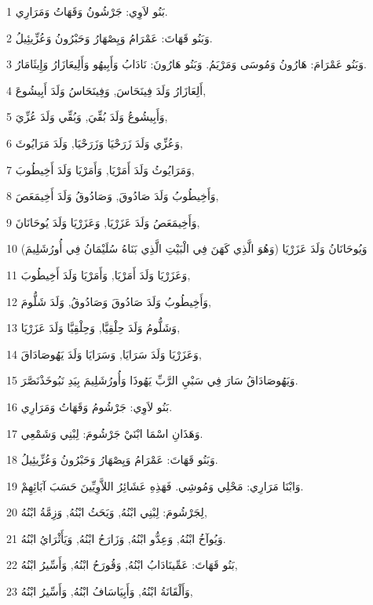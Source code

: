 \par 1 بَنُو لاَوِي: جَرْشُونُ وَقَهَاتُ وَمَرَارِي.
\par 2 وَبَنُو قَهَاتَ: عَمْرَامُ وَيِصْهَارُ وَحَبْرُونُ وَعُزِّيئِيلُ.
\par 3 وَبَنُو عَمْرَامَ: هَارُونُ وَمُوسَى وَمَرْيَمُ. وَبَنُو هَارُونَ: نَادَابُ وَأَبِيهُو وَأَلِيعَازَارُ وَإِيثَامَارُ.
\par 4 أَلِعَازَارُ وَلَدَ فِينَحَاسَ, وَفِينَحَاسُ وَلَدَ أَبِيشُوعَ,
\par 5 وَأَبِيشُوعُ وَلَدَ بُقِّيَ, وَبُقِّي وَلَدَ عُزِّيَ,
\par 6 وَعُزِّي وَلَدَ زَرَحْيَا وَزَرَحْيَا, وَلَدَ مَرَايُوثَ,
\par 7 وَمَرَايُوثُ وَلَدَ أَمَرْيَا, وَأَمَرْيَا وَلَدَ أَخِيطُوبَ,
\par 8 وَأَخِيطُوبُ وَلَدَ صَادُوقَ, وَصَادُوقُ وَلَدَ أَخِيمَعَصَ,
\par 9 وَأَخِيمَعَصُ وَلَدَ عَزَرْيَا, وَعَزَرْيَا وَلَدَ يُوحَانَانَ,
\par 10 وَيُوحَانَانُ وَلَدَ عَزَرْيَا (وَهُوَ الَّذِي كَهَنَ فِي الْبَيْتِ الَّذِي بَنَاهُ سُلَيْمَانُ فِي أُورُشَلِيمَ)
\par 11 وَعَزَرْيَا وَلَدَ أَمَرْيَا, وَأَمَرْيَا وَلَدَ أَخِيطُوبَ,
\par 12 وَأَخِيطُوبُ وَلَدَ صَادُوقَ وَصَادُوقُ, وَلَدَ شَلُّومَ,
\par 13 وَشَلُّومُ وَلَدَ حِلْقِيَّا, وَحِلْقِيَّا وَلَدَ عَزَرْيَا,
\par 14 وَعَزَرْيَا وَلَدَ سَرَايَا, وَسَرَايَا وَلَدَ يَهُوصَادَاقَ,
\par 15 وَيَهُوصَادَاقُ سَارَ فِي سَبْيِ الرَّبِّ يَهُوذَا وَأُورُشَلِيمَ بِيَدِ نَبُوخَذْنَصَّرَ.
\par 16 بَنُو لاَوِي: جَرْشُومُ وَقَهَاتُ وَمَرَارِي.
\par 17 وَهَذَانِ اسْمَا ابْنَيْ جَرْشُومَ: لِبْنِي وَشَمْعِي.
\par 18 وَبَنُو قَهَاتَ: عَمْرَامُ وَيِصْهَارُ وَحَبْرُونُ وَعُزِّيئِيلُ.
\par 19 وَابْنَا مَرَارِي: مَحْلِي وَمُوشِي. فَهَذِهِ عَشَائِرُ اللاَّوِيِّينَ حَسَبَ آبَائِهِمْ.
\par 20 لِجَرْشُومَ: لِبْنِي ابْنُهُ, وَيَحَثُ ابْنُهُ, وَزِمَّةُ ابْنُهُ,
\par 21 وَيُوآخُ ابْنُهُ, وَعِدُّو ابْنُهُ, وَزَارَحُ ابْنُهُ, وَيَأَثْرَايُ ابْنُهُ.
\par 22 بَنُو قَهَاتَ: عَمِّينَادَابُ ابْنُهُ, وَقُورَحُ ابْنُهُ, وَأَسِّيرُ ابْنُهُ,
\par 23 وَأَلْقَانَةُ ابْنُهُ, وَأَبِيَاسَافُ ابْنُهُ, وَأَسِّيرُ ابْنُهُ,
